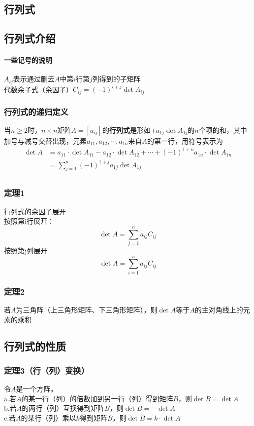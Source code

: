 \documentclass{article}
\begin{document}
\begin{CJK}{UTF8}{gkai}
\newpage
\section{行列式}
\subsection{行列式介绍}
\paragraph{一些记号的说明\\}
$A_{ij}$表示通过删去$A$中第$i$行第$j$列得到的子矩阵\\
代数余子式（余因子）$C_{ij}=(-1)^{i+j}\det A_{ij}$
\subsubsection{行列式的递归定义}
当$n\geq 2$时，$n\times n$矩阵$A=[a_{ij}]$的\textbf{行列式}是形如$\pm a_{1j}\det A_{1j} $的$n$个项的和，其中加号与减号交替出现，元素$a_{11},a_{12},\cdots,a_{1n}$来自$A$的第一行，用符号表示为\\
\[
\begin{aligned}    
\det A&=a_{11}\cdot\det A_{11}-a_{12}\cdot\det A_{12}+\cdots+(-1)^{1+n}a_{1n}\cdot\det A_{1n}\\
&=\sum_{j=1}^n (-1)^{1+j}a_{1j}\det A_{1j}\\
\end{aligned}
\]
\subsubsection{定理1}
行列式的余因子展开\\
按照第i行展开：\\
\[\det A=\sum_{j=1}^n a_{ij}C_{ij}\]
按照第j列展开\\
\[\det A=\sum_{i=1}^n a_{ij}C_{ij}\]
\subsubsection{定理2}
若$A$为三角阵（上三角形矩阵、下三角形矩阵），则$\det A$等于$A$的主对角线上的元素的乘积\\
\subsection{行列式的性质}
\subsubsection{定理3（行（列）变换）}
令$A$是一个方阵。\\
a.若$A$的某一行（列）的倍数加到另一行（列）得到矩阵$B$，则$\det B=\det A$\\
b.若$A$的两行（列）互换得到矩阵$B$，则$\det B=-\det A$\\
c.若$A$的某行（列）乘以$k$得到矩阵$B$，则$\det B=k\cdot \det A$\\

\end{CJK}
\end{document}
